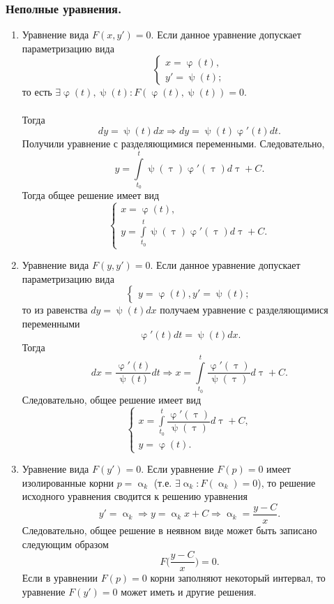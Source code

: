 \documentclass[a4paper, 12pt]{report}
\renewcommand{\alpha}{\upalpha}
\renewcommand{\varphi}{\upvarphi}
\renewcommand{\tau}{\uptau}
\renewcommand{\psi}{\uppsi}
\begin{document}
\subsubsection{Неполные уравнения.}
\begin{enumerate}
	\item Уравнение вида $F(x,y') = 0$. Если данное уравнение допускает параметризацию вида $$\begin{cases}
		x = \varphi(t),\\
		y' = \psi(t);
	\end{cases}$$
то есть $\exists \varphi(t), \psi(t) : F(\varphi(t),\psi(t)) = 0$.\\\\
Тогда $$dy = \psi(t)dx \Rightarrow dy = \psi(t)\varphi'(t)dt.$$
Получили уравнение с разделяющимися переменными. Следовательно, $$y = \int\limits_{t_0}^t \psi(\tau)\varphi'(\tau) d\tau + C.$$
Тогда общее решение имеет вид $$\begin{cases}
	x = \varphi(t),\\
	y = \int\limits_{t_0}^t \psi(\tau)\varphi'(\tau) d\tau + C.
\end{cases}$$
\item Уравнение вида $F(y,y') = 0$. Если данное уравнение допускает параметризацию вида
$$\begin{cases}
	y = \varphi(t),
	y' = \psi(t);
\end{cases}$$ то из равенства $dy = \psi(t)dx$ получаем уравнение с разделяющимися переменными $$\varphi'(t)dt =\psi(t)dx. $$
Тогда $$dx = \dfrac{\varphi'(t)}{\psi(t)}dt \Rightarrow x = \int\limits_{t_0}^t \dfrac{\varphi'(\tau)}{\psi(\tau)}d\tau + C.$$
Следовательно, общее решение имеет вид $$\begin{cases}
	x = \int\limits_{t_0}^t \dfrac{\varphi'(\tau)}{\psi(\tau)}d\tau + C,\\
	y = \varphi(t).
\end{cases}$$
\item Уравнение вида $F(y') = 0$. Если уравнение $F(p) = 0$ имеет изолированные корни $p = \alpha _k$ (т.е. $\exists \alpha _k : F(\alpha_k) = 0$), то решение исходного уравнения сводится к решению уравнения $$y' = \alpha_k \Rightarrow y = \alpha_k x + C \Rightarrow \alpha_k = \dfrac{y - C}{x}.$$
Следовательно, общее решение в неявном виде может быть записано следующим образом $$F\Big(\dfrac{y - C}{x}\Big) = 0.$$
Если в уравнении $F(p) = 0$ корни заполняют некоторый интервал, то уравнение $F(y') = 0$ может иметь и другие решения.
\end{enumerate}
\end{document}
